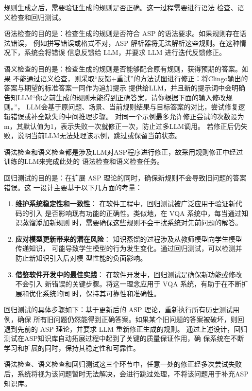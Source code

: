 规则生成之后，需要验证生成的规则是否正确。这一过程需要进行语法
检查、语义检查和回归测试。

语法检查的目的是：检查生成的规则是否符合 ASP 的语法要求。如果规则存在语法错误，
例如拼写错误或格式不对，ASP 解析器将无法解析这些规则。在这种情况下，系统会将错误
信息反馈给 LLM，并要求 LLM 进行迭代反馈修正。

语义检查的目的是：检查生成的规则是否能够配合原有规则，获得预期的答案。如果
不能通过语义检查，则采取“反馈+重试”的方法试图进行修正：将Clingo输出的答案与期望的标准答案一同作为追加提示
提供给LLM，并且新的提示词中会明确告知LLM“你之前生成的规则未能得到正确答案，请你根据下面的输入修改规则。”，
LLM会基于原问题、场景、当前规则结果与目标答案的对比，尝试修复逻辑错误或补全缺失的中间推理步骤。
对同一个示例最多允许修正尝试的次数设为m，其默认值为1，表示失败一次就修正一次，防止过多LLM调用。
若修正后仍失败，说明当前LLM无法处理该示例，跳过或保留当前状态。

语法检查和语义检查都是涉及LLM对ASP程序进行修正，故采用规则修正中经过训练的LLM来完成此处的
语法检查和语义检查任务。

回归测试的目的是：在扩展 ASP 理论的同时，确保新规则不会导致旧问题的答案错误。这
一设计主要基于以下几方面的考量：
\begin{enumerate}[nosep]
\item \textbf{维护系统稳定性和一致性}： 在软件工程中，回归测试被广泛应用于验证新代码的引入
是否影响现有功能的正确性。类似地，在 VQA 系统中，每当通过知识蒸馏添加新规则
时，需要确保这些规则不会干扰系统对先前问题的解答。
\item \textbf{应对模型更新带来的潜在风险}： 知识蒸馏的过程涉及从教师模型向学生模型传递知识，
可能导致学生模型的行为发生变化。通过回归测试，可以检测并防止新知识引入后对模
型性能的负面影响。
\item \textbf{借鉴软件开发中的最佳实践}： 在软件开发中，回归测试是确保新功能或修改不会引入
新错误的关键步骤。将这一理念应用于 VQA 系统，有助于在不断扩展和优化系统的同
时，保持其可靠性和准确性。
\end{enumerate}

回归测试的具体步骤如下：基于更新后的 ASP 理论，重新执行所有历史测试用例，确保
所有旧问题仍然能得到正确答案。如果某个旧问题的答案被破坏，则回退到先前的 ASP 理论，并要求 LLM 重新修正生成的规则。
通过上述设计，回归测试在ASP知识库自动拓展过程中起到了关键的质量保证作用，确
保系统在不断学习和扩展的同时，保持其稳定性和可靠性。

语法检查、语义检查和回归测试这三个环节中，任意一处的修正经多次尝试失败后，系统将视为该问题暂时无法解决，会进行跳过处理，不将该问题用于补充ASP知识库。
